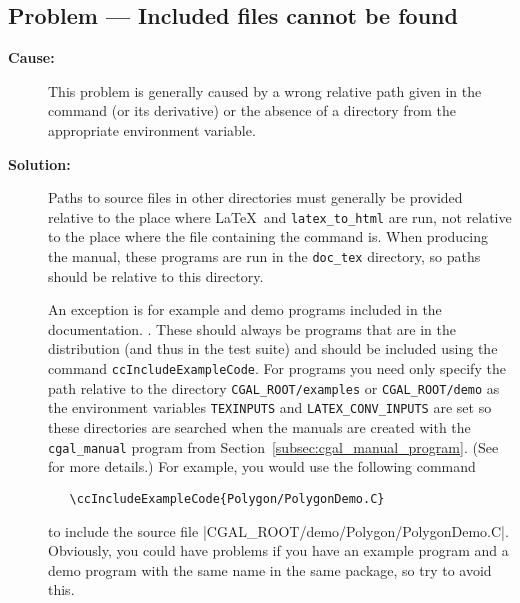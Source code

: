\subsection*{Problem --- Included files cannot be found}

\begin{description}
\item[{\bf Cause:}] This problem is generally caused by a wrong relative path
given in the \verb|| command (or its derivative) or the absence of a 
directory from the appropriate environment variable.

\item[{\bf Solution:}] Paths to source files in other directories must
generally be provided relative to the place where \LaTeX\ and
\texttt{latex\_to\_html} are run, not relative to the place where
the file containing the command is.  When producing the manual,
these programs are run in the \texttt{doc\_tex} directory, so paths
should be relative to this directory.

An exception is for example and demo programs included in the documentation.
.  These should always
be programs that are in the distribution (and thus in the test suite)
and should be included using the command \texttt{ccIncludeExampleCode}.  For 
programs you need only specify the path relative to the directory 
\texttt{CGAL\_ROOT/examples} or \texttt{CGAL\_ROOT/demo} as the environment 
variables \texttt{TEXINPUTS} and \texttt{LATEX\_CONV\_INPUTS} are set so these 
directories are searched when the manuals are created with the
\texttt{cgal\_manual} program from Section~\ref{subsec:cgal_manual_program}.  
(See
for more details.)
For example, you would use the following command
\begin{verbatim}
   \ccIncludeExampleCode{Polygon/PolygonDemo.C}
\end{verbatim}
to include the source file \nonlinkedpath|CGAL_ROOT/demo/Polygon/PolygonDemo.C|.
Obviously, you could have problems if you have an example program and a demo
program with the same name in the same package, so try to avoid this.
\end{description}


